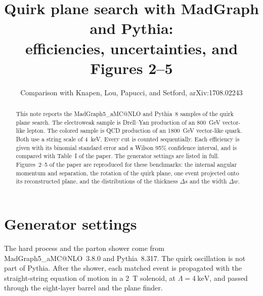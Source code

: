 \documentclass[11pt,a4paper]{article}
\title{Quirk plane search with MadGraph and Pythia:\\ efficiencies, uncertainties, and Figures 2--5}
\author{Comparison with Knapen, Lou, Papucci, and Setford, arXiv:1708.02243}
\date{}
\begin{document}
\maketitle

\begin{abstract}
This note reports the MadGraph5\_aMC@NLO and Pythia~8 samples of the quirk plane search.
The electroweak sample is Drell--Yan production of an \SI{800}{\GeV} vector-like lepton.
The colored sample is QCD production of an \SI{1800}{\GeV} vector-like quark.
Both use a string scale of \SI{4}{\keV}.
Every cut is counted sequentially.
Each efficiency is given with its binomial standard error and a Wilson 95\% confidence interval, and is compared with Table~I of the paper.
The generator settings are listed in full.
Figures~2--5 of the paper are reproduced for these benchmarks: the internal angular momentum and separation, the rotation of the quirk plane, one event projected onto its reconstructed plane, and the distributions of the thickness \(\Delta s\) and the width \(\Delta w\).
\end{abstract}

\section{Generator settings}
The hard process and the parton shower come from MadGraph5\_aMC@NLO~3.8.0 and Pythia~8.317.
The quirk oscillation is not part of Pythia.
After the shower, each matched event is propagated with the straight-string equation of motion in a \SI{2}{\tesla} solenoid, at \(\Lambda = \SI{4}{\keV}\), and passed through the eight-layer barrel and the plane finder.
\end{document}
